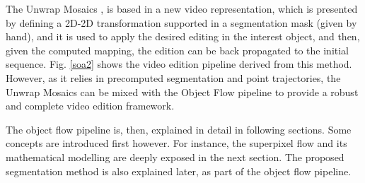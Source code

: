 The Unwrap Mosaics \cite{c41}, is based in a new 
video representation, which is presented by defining a 2D-2D transformation supported in a segmentation mask (given by hand), and it is used to apply the desired editing in the 
interest object, and then, given the computed mapping, the edition can be back propagated to the initial sequence. Fig. \ref{soa2} shows the video edition pipeline derived from 
this method. However, as it relies in precomputed segmentation and point trajectories, the Unwrap Mosaics can be mixed with the Object Flow pipeline to provide a robust and 
complete video edition framework. 

The object flow pipeline is, then, explained in detail in following sections. Some concepts 
are introduced first however. For instance, the superpixel flow and its mathematical 
modelling are deeply exposed in the next section. The proposed segmentation method 
is also explained later, as part of the object flow pipeline.
